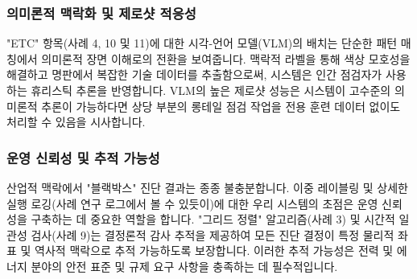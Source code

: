 \subsubsection{의미론적 맥락화 및 제로샷 적응성}
"ETC" 항목(사례 4, 10 및 11)에 대한 시각-언어 모델(VLM)의 배치는 단순한 패턴 매칭에서 의미론적 장면 이해로의 전환을 보여줍니다.
맥락적 라벨을 통해 색상 모호성을 해결하고 명판에서 복잡한 기술 데이터를 추출함으로써, 시스템은 인간 점검자가 사용하는 휴리스틱 추론을 반영합니다.
VLM의 높은 제로샷 성능은 시스템이 고수준의 의미론적 추론이 가능하다면 상당 부분의 롱테일 점검 작업을 전용 훈련 데이터 없이도 처리할 수 있음을 시사합니다.

\subsubsection{운영 신뢰성 및 추적 가능성}
산업적 맥락에서 "블랙박스" 진단 결과는 종종 불충분합니다.
이중 레이블링 및 상세한 실행 로깅(사례 연구 로그에서 볼 수 있듯이)에 대한 우리 시스템의 초점은 운영 신뢰성을 구축하는 데 중요한 역할을 합니다.
"그리드 정렬" 알고리즘(사례 3) 및 시간적 일관성 검사(사례 9)는 결정론적 감사 추적을 제공하여 모든 진단 결정이 특정 물리적 좌표 및 역사적 맥락으로 추적 가능하도록 보장합니다.
이러한 추적 가능성은 전력 및 에너지 분야의 안전 표준 및 규제 요구 사항을 충족하는 데 필수적입니다.

